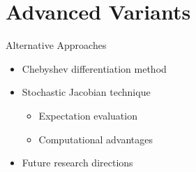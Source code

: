 \documentclass{beamer}
\begin{document}
\section{Advanced Variants}

\begin{frame}{Alternative Approaches}
\begin{itemize}
\item Chebyshev differentiation method
\item Stochastic Jacobian technique
\begin{itemize}
\item Expectation evaluation
\item Computational advantages
\end{itemize}
\item Future research directions
\end{itemize}
\end{frame}
\end{document}
